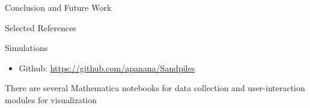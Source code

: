 \documentclass[final]{beamer}
\newlength{\onecolwid}
\begin{document}
\begin{frame}[t]
\begin{columns}[t]
\begin{column}{\onecolwid}
\begin{block}{Conclusion and Future Work}
\end{block}



\begin{block}{Selected References}

\nocite{*} %
\small{
\vspace{0.75in}}

\end{block}




\begin{alertblock}{Simulations}

\begin{itemize}
\item Github: \href{https://github.com/apanana/Sandpiles}{https://github.com/apanana/Sandpiles}
\end{itemize}

There are several Mathematica notebooks for data collection and user-interaction modules for visualization
\end{alertblock}


\end{column} %

\end{columns} %

\end{frame} %
\end{document}
